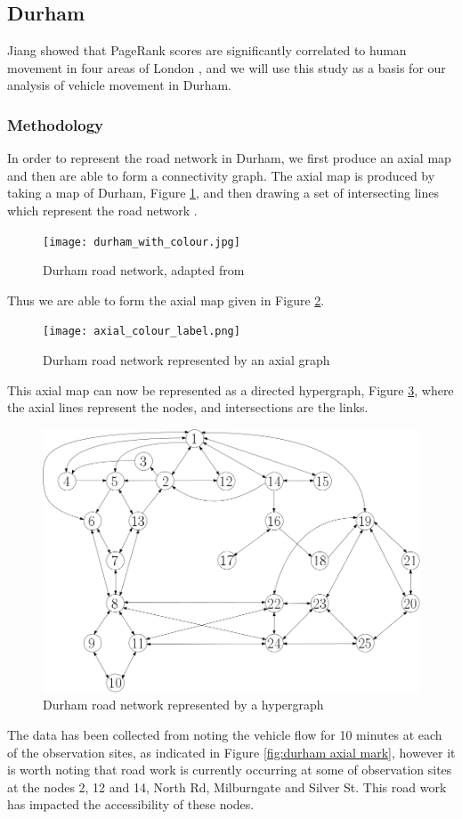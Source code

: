 \documentclass[11pt]{report}
\begin{document}
{\subsection{Durham} \label{sec:durham}
Jiang showed that PageRank scores are significantly correlated to human movement in four areas of London \cite{doi:10.1080/13658810802022822}, and we will use this study as a basis for our analysis of vehicle movement in Durham. 
\subsubsection{Methodology}
In order to represent the road network in Durham, we first produce an axial map and then are able to form a connectivity graph. The axial map is produced by taking a map of Durham, Figure \ref{fig:durham map}, and then drawing a set of intersecting lines which represent the road network \cite{Axialmap40:online}.
\begin{figure}[h]
\centering
\texttt{[image: durham\_with\_colour.jpg]}
\caption{Durham road network, adapted from \cite{undergraduate}}
\label{fig:durham map}
\end{figure} Thus we are able to form the axial map given in Figure \ref{fig:durham axial}. \begin{figure}[h]
\centering
\texttt{[image: axial\_colour\_label.png]}
\caption{Durham road network represented by an axial graph}
\label{fig:durham axial}
\end{figure}
This axial map can now be represented as a directed hypergraph, Figure \ref{fig:durham graph}, where the axial lines represent the nodes, and intersections are the links. 
\begin{figure}[h]
\centering
\includegraphics[width=0.5\linewidth]{ipe_durham.png}
\caption{Durham road network represented by a hypergraph}
\label{fig:durham graph}
\end{figure}

The data has been collected from noting the vehicle flow for 10 minutes at each of the observation sites, as indicated in Figure \ref{fig:durham axial mark}, however it is worth noting that road work is currently occurring at some of observation sites at the nodes 2, 12 and 14, North Rd, Milburngate and Silver St. This road work has impacted the accessibility of these nodes.

}
\end{document}
